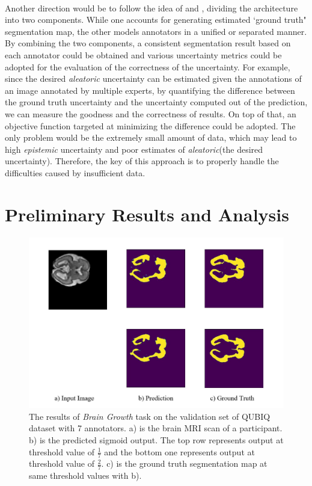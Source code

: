 \documentclass[12pt]{extarticle}
\begin{document}
\paragraph{}
Another direction would be to follow the idea of 
\cite{zhang2020disentangling} and \cite{kohl2019probabilistic}, 
dividing the architecture into two components. 
While one accounts for generating estimated `ground truth" segmentation map,
the other models annotators in a unified or separated manner. By combining 
the two components, a consistent segmentation result based on each annotator 
could be obtained and various uncertainty metrics could be adopted for
the evaluation of the correctness of the uncertainty. For example,
since the desired \textit{aleatoric} uncertainty can be 
estimated given the annotations of an image annotated by multiple experts\cite{qubiq}, 
by quantifying the difference between the ground truth uncertainty and 
the uncertainty computed out of the prediction, we can measure the goodness and the correctness of
results. On top of that, an objective function targeted at 
minimizing the difference could be adopted. The only problem would be the 
extremely small amount of data, which may lead to high \textit{epistemic} uncertainty and 
poor estimates of \textit{aleatoric}(the desired uncertainty). Therefore, the key of this approach 
is to properly handle the difficulties caused by insufficient data.

\section{Preliminary Results and Analysis}
\begin{figure}[ht!]
\centering
\includegraphics[scale=0.28]{fig1.jpg}
\caption{The results of \textit{Brain Growth} task on the validation set of 
QUBIQ dataset with 7 annotators. a) is the brain 
MRI scan of a participant. b) is the predicted sigmoid output. The top row represents output at threshold  
value of $\frac{1}{7}$ and the bottom one represents output at threshold value of $\frac{2}{7}$. c) is the 
ground truth segmentation map at same threshold values with b).}
\label{pre_results}
\end{figure}
\end{document}
